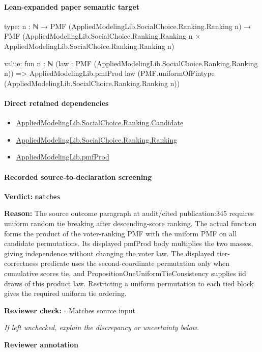 \documentclass[10pt]{article}
\newcommand{\reviewerbox}{%
  \par\noindent\fbox{\parbox{0.96\linewidth}{\rule{0pt}{0.38in}}}\par
}
\newcommand{\reviewmatch}[1]{%
  \par\noindent\textbf{Reviewer check:} $\square$\; #1\par
  \noindent\emph{If left unchecked, explain the discrepancy or uncertainty below.}\par
}
\begin{document}
\paragraph{Lean-expanded paper semantic target}
\begin{ReviewVerbatim}
type:
{n : ℕ} →
  PMF (AppliedModelingLib.SocialChoice.Ranking.Ranking n) →
    PMF (AppliedModelingLib.SocialChoice.Ranking.Ranking n × AppliedModelingLib.SocialChoice.Ranking.Ranking n)

value:
fun {n : ℕ} (law : PMF (AppliedModelingLib.SocialChoice.Ranking.Ranking n)) =>
  AppliedModelingLib.pmfProd law (PMF.uniformOfFintype (AppliedModelingLib.SocialChoice.Ranking.Ranking n))
\end{ReviewVerbatim}

\paragraph{Direct retained dependencies}
\begin{itemize}\raggedright
\item \hyperlink{governing-declaration-8c0e6c25845ae78a}{Applied\allowbreak{}Modeling\allowbreak{}Lib.\allowbreak{}Social\allowbreak{}Choice.\allowbreak{}Ranking.\allowbreak{}Candidate}
\item \hyperlink{governing-declaration-5cde54446d1ae021}{Applied\allowbreak{}Modeling\allowbreak{}Lib.\allowbreak{}Social\allowbreak{}Choice.\allowbreak{}Ranking.\allowbreak{}Ranking}
\item \hyperlink{governing-declaration-de8e2a8bfe221a38}{Applied\allowbreak{}Modeling\allowbreak{}Lib.\allowbreak{}pmf\allowbreak{}Prod}
\end{itemize}
\paragraph{Recorded source-to-declaration screening}
\textbf{Verdict:} \texttt{matches}
\\
{\raggedright
\textbf{Reason:} The source outcome paragraph at audit/\allowbreak{}cited publication:\allowbreak{}345 requires uniform random tie breaking after descending-\allowbreak{}score ranking.\allowbreak{} The actual function forms the product of the voter-\allowbreak{}ranking PMF with the uniform PMF on all candidate permutations.\allowbreak{} Its displayed pmfProd body multiplies the two masses, giving independence without changing the voter law.\allowbreak{} The displayed tier-\allowbreak{}correctness predicate uses the second-\allowbreak{}coordinate permutation only when cumulative scores tie, and PropositionOneUniformTieConsistency supplies iid draws of this product law.\allowbreak{} Restricting a uniform permutation to each tied block gives the required uniform tie ordering.\allowbreak{}
\par}
\reviewmatch{Matches source input}
\noindent\textbf{Reviewer annotation}\par
\reviewerbox
\end{document}
